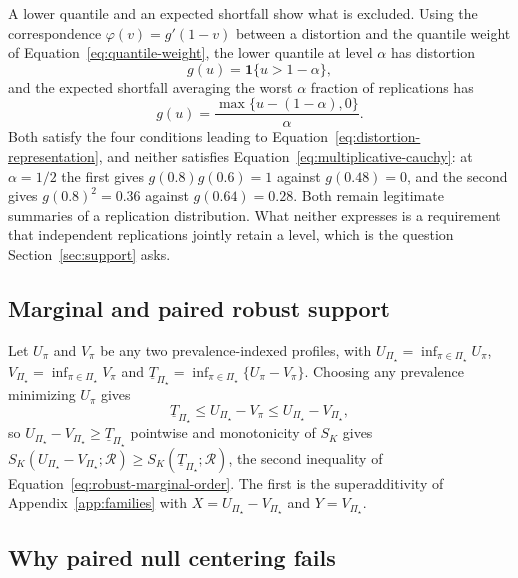 \documentclass[11pt]{article}
\newcommand{\Regime}{\mathcal{R}}
\newcommand{\PSet}{\Pi_\star}
\theoremstyle{remark}
\begin{document}
A lower quantile and an expected shortfall show what is excluded. Using the correspondence $\varphi(v)=g'(1-v)$ between a distortion and the quantile weight of Equation~\eqref{eq:quantile-weight}, the lower quantile at level $\alpha$ has distortion
\[
g(u)=\mathbf{1}\{u>1-\alpha\},
\]
and the expected shortfall averaging the worst $\alpha$ fraction of replications has
\[
g(u)=\frac{\max\{u-(1-\alpha),0\}}{\alpha}.
\]
Both satisfy the four conditions leading to Equation~\eqref{eq:distortion-representation}, and neither satisfies Equation~\eqref{eq:multiplicative-cauchy}: at $\alpha=1/2$ the first gives $g(0.8)g(0.6)=1$ against $g(0.48)=0$, and the second gives $g(0.8)^2=0.36$ against $g(0.64)=0.28$. Both remain legitimate summaries of a replication distribution. What neither expresses is a requirement that independent replications jointly retain a level, which is the question Section~\ref{sec:support} asks.

\subsection{Marginal and paired robust support}

Let $U_\pi$ and $V_\pi$ be any two prevalence-indexed profiles, with $U_{\PSet}=\inf_{\pi\in\PSet}U_\pi$, $V_{\PSet}=\inf_{\pi\in\PSet}V_\pi$ and $\underline{T}_{\PSet}=\inf_{\pi\in\PSet}\{U_\pi-V_\pi\}$. Choosing any prevalence minimizing $U_\pi$ gives
\[
\underline{T}_{\PSet}
\leq
U_{\PSet}-V_\pi
\leq
U_{\PSet}-V_{\PSet},
\]
so $U_{\PSet}-V_{\PSet}\geq\underline{T}_{\PSet}$ pointwise and monotonicity of $S_K$ gives $S_K(U_{\PSet}-V_{\PSet};\Regime)\geq S_K(\underline{T}_{\PSet};\Regime)$, the second inequality of Equation~\eqref{eq:robust-marginal-order}. The first is the superadditivity of Appendix~\ref{app:families} with $X=U_{\PSet}-V_{\PSet}$ and $Y=V_{\PSet}$.

\subsection{Why paired null centering fails}
\label{app:paired-null}
\end{document}
